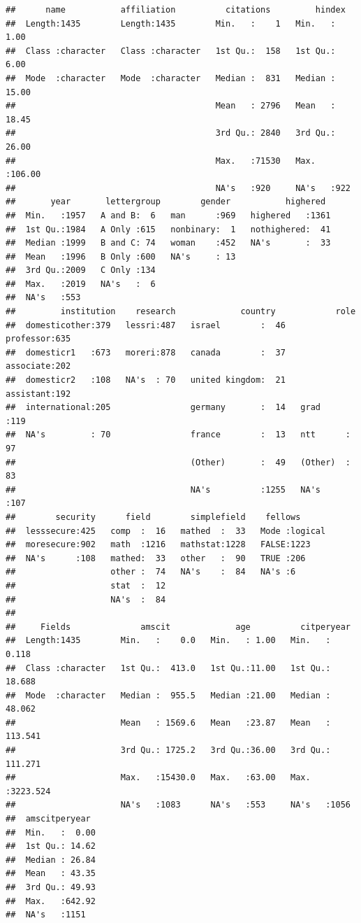 \documentclass[]{article}
\begin{document}
\begin{verbatim}
##      name           affiliation          citations         hindex      
##  Length:1435        Length:1435        Min.   :    1   Min.   :  1.00  
##  Class :character   Class :character   1st Qu.:  158   1st Qu.:  6.00  
##  Mode  :character   Mode  :character   Median :  831   Median : 15.00  
##                                        Mean   : 2796   Mean   : 18.45  
##                                        3rd Qu.: 2840   3rd Qu.: 26.00  
##                                        Max.   :71530   Max.   :106.00  
##                                        NA's   :920     NA's   :922     
##       year       lettergroup        gender           highered   
##  Min.   :1957   A and B:  6   man      :969   highered   :1361  
##  1st Qu.:1984   A Only :615   nonbinary:  1   nothighered:  41  
##  Median :1999   B and C: 74   woman    :452   NA's       :  33  
##  Mean   :1996   B Only :600   NA's     : 13                     
##  3rd Qu.:2009   C Only :134                                     
##  Max.   :2019   NA's   :  6                                     
##  NA's   :553                                                    
##         institution    research             country            role    
##  domesticother:379   lessri:487   israel        :  46   professor:635  
##  domesticr1   :673   moreri:878   canada        :  37   associate:202  
##  domesticr2   :108   NA's  : 70   united kingdom:  21   assistant:192  
##  international:205                germany       :  14   grad     :119  
##  NA's         : 70                france        :  13   ntt      : 97  
##                                   (Other)       :  49   (Other)  : 83  
##                                   NA's          :1255   NA's     :107  
##        security      field        simplefield    fellows       
##  lesssecure:425   comp  :  16   mathed  :  33   Mode :logical  
##  moresecure:902   math  :1216   mathstat:1228   FALSE:1223     
##  NA's      :108   mathed:  33   other   :  90   TRUE :206      
##                   other :  74   NA's    :  84   NA's :6        
##                   stat  :  12                                  
##                   NA's  :  84                                  
##                                                                
##     Fields              amscit             age          citperyear      
##  Length:1435        Min.   :    0.0   Min.   : 1.00   Min.   :   0.118  
##  Class :character   1st Qu.:  413.0   1st Qu.:11.00   1st Qu.:  18.688  
##  Mode  :character   Median :  955.5   Median :21.00   Median :  48.062  
##                     Mean   : 1569.6   Mean   :23.87   Mean   : 113.541  
##                     3rd Qu.: 1725.2   3rd Qu.:36.00   3rd Qu.: 111.271  
##                     Max.   :15430.0   Max.   :63.00   Max.   :3223.524  
##                     NA's   :1083      NA's   :553     NA's   :1056      
##  amscitperyear   
##  Min.   :  0.00  
##  1st Qu.: 14.62  
##  Median : 26.84  
##  Mean   : 43.35  
##  3rd Qu.: 49.93  
##  Max.   :642.92  
##  NA's   :1151
\end{verbatim}
\end{document}
